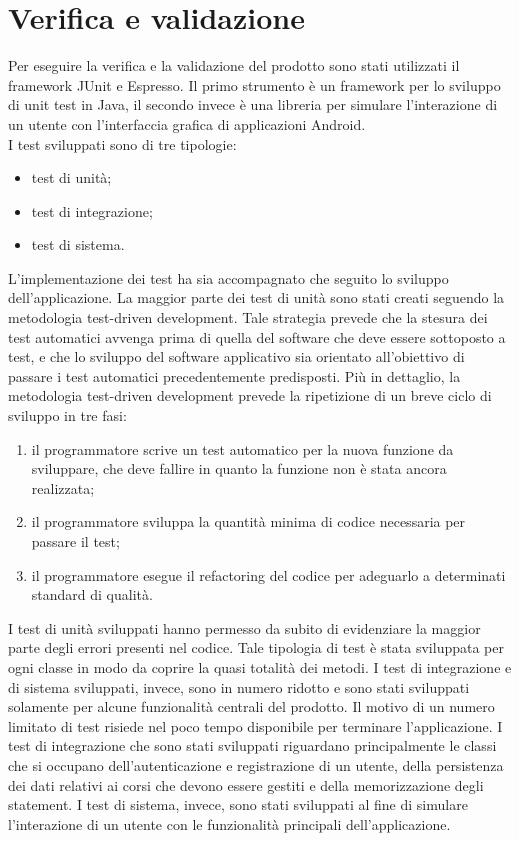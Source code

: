 \documentclass[../Tesi.tex]{subfiles}
\begin{document}
\section{Verifica e validazione}
	Per eseguire la verifica e la validazione del prodotto sono stati utilizzati il framework JUnit e Espresso. Il primo strumento è un framework per lo sviluppo di unit test in Java, il secondo invece è una libreria per 
	simulare l'interazione di un utente con l'interfaccia grafica di applicazioni Android. \\
	I test sviluppati sono di tre tipologie:
	\begin{itemize}
		\item test di unità;
		\item test di integrazione;
		\item test di sistema.
	\end{itemize}
	L'implementazione dei test ha sia accompagnato che seguito lo sviluppo dell'applicazione. La maggior parte dei test di unità sono stati creati seguendo la metodologia test-driven development. Tale strategia prevede che la stesura dei test automatici avvenga prima di quella del software che deve essere sottoposto a test, e che lo sviluppo del software applicativo sia orientato all'obiettivo di passare i test automatici precedentemente predisposti. Più in dettaglio, la metodologia test-driven development prevede la ripetizione di un breve ciclo di sviluppo in tre fasi:
	\begin{enumerate}
		\item il programmatore scrive un test automatico per la nuova funzione da sviluppare, che deve fallire in quanto la funzione non è stata ancora realizzata;
		\item il programmatore sviluppa la quantità minima di codice necessaria per passare il test;
		\item il programmatore esegue il refactoring del codice per adeguarlo a determinati standard di qualità.
	\end{enumerate}
	I test di unità sviluppati hanno permesso da subito di evidenziare la maggior parte degli errori presenti nel codice. Tale tipologia di test è stata sviluppata per ogni classe in modo da coprire la quasi totalità dei metodi. I test di integrazione e di sistema sviluppati, invece, sono in numero ridotto e sono stati sviluppati solamente per alcune funzionalità centrali del prodotto. Il motivo di un numero limitato di test risiede nel poco tempo disponibile per terminare l'applicazione. I test di integrazione che sono stati sviluppati riguardano principalmente le classi che si occupano dell'autenticazione e registrazione di un utente, della persistenza dei dati relativi ai corsi che devono essere gestiti e della memorizzazione degli statement. I test di sistema, invece, sono stati sviluppati al fine di simulare l'interazione di un utente con le funzionalità principali dell'applicazione.\\
\end{document}
